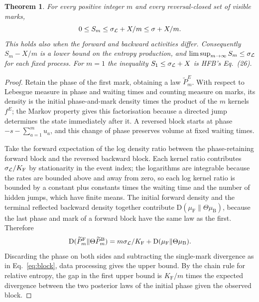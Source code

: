 \documentclass[11pt,a4paper]{article}
\newtheorem{theorem}{Theorem}
\newcommand{\KL}{\mathrm D}
\newcommand{\F}{\mathrm F}
\newcommand{\B}{\mathrm B}
\begin{document}
\begin{theorem}\label{th:block}
For every positive integer $m$ and every reversal-closed set of visible marks,
\begin{equation}
 0\leq S_m\leq \sigma_{\cal L}+X/m\leq\sigma+X/m .
 \label{eq:upper}
\end{equation}
This holds also when the forward and backward activities differ. Consequently $S_m-X/m$ is a lower bound on the entropy production, and $\limsup_{m\to\infty} S_m\leq\sigma_{\cal L}$ for each fixed process. For $m=1$ the inequality $S_1\le\sigma_{\cal L}+X$ is HFB's Eq.~(26).
\end{theorem}
\begin{proof}
Retain the phase of the first mark, obtaining a law $\widetilde P_m^E$. With respect to Lebesgue measure in phase and waiting times and counting measure on marks, its density is the initial phase-and-mark density times the product of the $m$ kernels $f^E$; the Markov property gives this factorisation because a directed jump determines the state immediately after it. A reversed block starts at phase $-s-\sum_{a=1}^m u_a$, and this change of phase preserves volume at fixed waiting times.

Take the forward expectation of the log density ratio between the phase-retaining forward block and the reversed backward block. Each kernel ratio contributes $\sigma_{\cal L}/K_\F$ by stationarity in the event index; the logarithms are integrable because the rates are bounded above and away from zero, so each log kernel ratio is bounded by a constant plus constants times the waiting time and the number of hidden jumps, which have finite means. The initial forward density and the terminal reflected backward density together contribute $\KL(\mu_\F\|\Theta\mu_\B)$, because the last phase and mark of a forward block have the same law as the first. Therefore
\begin{equation}
 \KL(\widetilde P_m^\F\|\Theta\widetilde P_m^\B)
   =m\sigma_{\cal L}/K_\F+\KL(\mu_\F\|\Theta\mu_\B).
 \label{eq:full}
\end{equation}
Discarding the phase on both sides and subtracting the single-mark divergence as in Eq.~\eqref{eq:block}, data processing gives the upper bound. By the chain rule for relative entropy, the gap in the first upper bound is $K_\F/m$ times the expected divergence between the two posterior laws of the initial phase given the observed block.
\end{proof}
\end{document}
